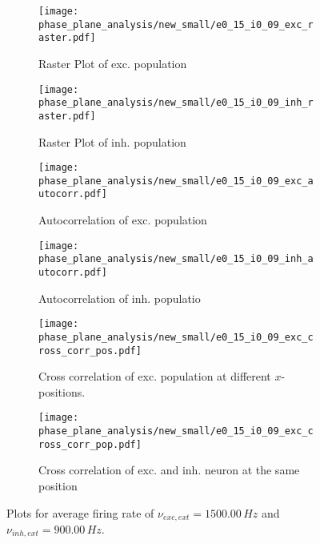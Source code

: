 \documentclass[a4paper,12pt]{article}
\begin{document}
\begin{figure}
    \begin{subfigure}[b]{0.49\textwidth}
        \texttt{[image: phase\_plane\_analysis/new\_small/e0\_15\_i0\_09\_exc\_raster.pdf]}
        \caption{Raster Plot of exc. population}
    \end{subfigure}
    \begin{subfigure}[b]{0.49\textwidth}
        \texttt{[image: phase\_plane\_analysis/new\_small/e0\_15\_i0\_09\_inh\_raster.pdf]}
        \caption{Raster Plot of inh. population}
    \end{subfigure}
    \begin{subfigure}[b]{0.49\textwidth}
        \texttt{[image: phase\_plane\_analysis/new\_small/e0\_15\_i0\_09\_exc\_autocorr.pdf]}
        \caption{Autocorrelation of exc. population}
    \end{subfigure}
    \begin{subfigure}[b]{0.49\textwidth}
        \texttt{[image: phase\_plane\_analysis/new\_small/e0\_15\_i0\_09\_inh\_autocorr.pdf]}
        \caption{Autocorrelation of inh. populatio}
    \end{subfigure}
    \begin{subfigure}[b]{0.49\textwidth}
        \texttt{[image: phase\_plane\_analysis/new\_small/e0\_15\_i0\_09\_exc\_cross\_corr\_pos.pdf]}
        \caption{Cross correlation of exc. population at different $x$-positions.}
    \end{subfigure}
    \begin{subfigure}[b]{0.49\textwidth}
        \texttt{[image: phase\_plane\_analysis/new\_small/e0\_15\_i0\_09\_exc\_cross\_corr\_pop.pdf]}
        \caption{Cross correlation of exc. and inh. neuron at the same position}
    \end{subfigure}
    \caption{Plots for average firing rate of 
                $\nu_{exc,ext} = 1500.00 \,\si{Hz}$ and $\nu_{inh,ext} = 900.00 \,\si{Hz}$.
                }
\end{figure}
    
\end{document}
